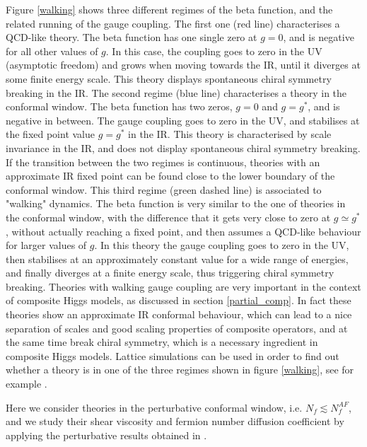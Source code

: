 Figure \ref{walking} shows three different regimes of the beta function, and the related running of the gauge coupling. The first one (red line) characterises a QCD-like theory. The beta function has one single zero at $g=0$, and is negative for all other values of $g$. In this case, the coupling goes to zero in the UV (asymptotic freedom) and grows when moving towards the IR, until it diverges at some finite energy scale. 
This theory displays spontaneous chiral symmetry breaking in the IR. The second regime (blue line) characterises a theory in the conformal window. The beta function has two zeros, $g=0$ and $g=g^*$, and is negative in between. The gauge coupling goes to zero in the UV, and stabilises at the fixed point value $g=g^*$ in the IR. 
This theory is characterised by scale invariance in the IR, and does not display spontaneous chiral symmetry breaking. 
If the transition between the two regimes is continuous, theories with an approximate IR fixed point can be found close to the lower boundary of the conformal window. 
This third regime (green dashed line) is associated to "walking" dynamics.
The beta function is very similar to the one of theories in the conformal window, with the difference that it gets very close to zero at $g\simeq g^*$, without actually reaching a fixed point, and then assumes a QCD-like behaviour for larger values of $g$. In this theory the gauge coupling goes to zero in the UV, then stabilises at an approximately constant value for a wide range of energies, and finally diverges at a finite energy scale, thus triggering chiral symmetry breaking. 
Theories with walking gauge coupling are very important in the context of composite Higgs models, as discussed in section \ref{partial_comp}. In fact these theories show an approximate IR conformal behaviour, which can lead to a nice separation of scales and good scaling properties of composite operators, and at the same time break chiral symmetry, which is a necessary ingredient in composite Higgs models.
Lattice simulations can be used in order to find out whether a theory is in one of the three regimes shown in figure \ref{walking}, see for example \cite{Hietanen:2008mr,Hansen:2017ejh}.

Here we consider theories in the perturbative conformal window, i.e. $N_f \lesssim N_f^{AF}$, and we study their shear viscosity and fermion number diffusion coefficient by applying the perturbative results obtained in \cite{Arnold:2000dr}.


